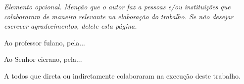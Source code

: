 \begin{agradecimentos}

\textit{Elemento opcional. Menção que o autor faz a pessoas e/ou instituições que colaboraram de maneira relevante na elaboração do trabalho. Se não desejar escrever agradecimentos, delete esta página. }

Ao professor fulano, pela...

Ao Senhor cicrano, pela...

A todos que direta ou indiretamente colaboraram na execução deste trabalho.
\end{agradecimentos}
